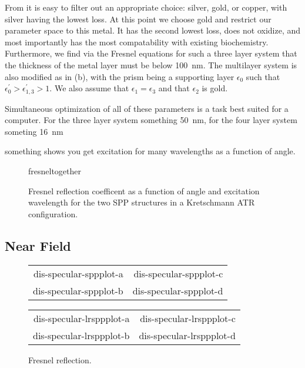 From  it is easy to filter out an appropriate
choice: silver, gold, or copper, with silver having the lowest loss.  At
this point we choose gold and restrict our parameter space to this metal.
It has the second lowest loss, does not oxidize, and most importantly has
the most compatability with existing biochemistry.  Furthermore, we find
via the Fresnel equations for such a three layer system that the thickness
of the metal layer must be below \SI{100}{\nano\meter}.  The multilayer
system is also modified as in (b), with the
prism being a supporting layer $\epsilon_0$ such that
$\epsilon^\prime_0>\epsilon^\prime_{1,3}>1$.  We also assume that
$\epsilon_1=\epsilon_3$ and that $\epsilon_2$ is gold.

Simultaneous optimization of all of these parameters is a task best suited
for a computer.  For the three layer system something \SI{50}{\nano\meter},
 for the four layer system someting \SI{16}{\nano\meter}

something  shows you get excitation for many
wavelengths as a function of angle.

\begin{figure}[ht]
\centering
{fresneltogether}
\caption{Fresnel reflection coefficent as a function of angle and
excitation wavelength for the two SPP structures in a Kretschmann ATR 
configuration.}
\label{fig:fresnelangle}
\end{figure}

\subsection{Near Field}
\begin{figure}[ht]
 \centering
 \pgfplotsset{
 minor tick num=3,
 footnotesize,
 trim axis right,
 max space between ticks=30pt,
}
\tikzset{baseline}
\begin{tabular}{rr}
{dis-specular-sppplot-a}&{dis-specular-sppplot-c}\\
{dis-specular-sppplot-b}&{dis-specular-sppplot-d}
\end{tabular}
\begin{tabular}{rr}
{dis-specular-lrsppplot-a}&{dis-specular-lrsppplot-c}\\
{dis-specular-lrsppplot-b}&{dis-specular-lrsppplot-d}
\end{tabular}
\label{fig:fresnellrsppfig}
\caption{Fresnel reflection.}
\end{figure}

